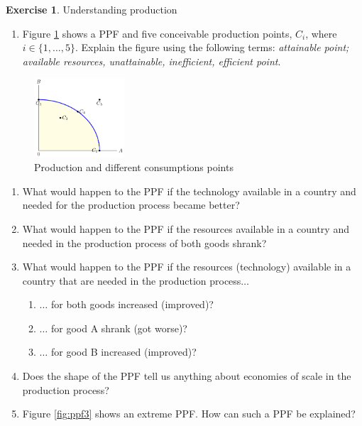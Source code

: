 \documentclass[
  12pt,
  oneside]{book}
\providecommand{\tightlist}{%
  \setlength{\itemsep}{0pt}\setlength{\parskip}{0pt}}
\theoremstyle{definition}
\theoremstyle{definition}
\theoremstyle{definition}
\newtheorem{exercise}{Exercise}[chapter]
\theoremstyle{definition}
\theoremstyle{remark}
\begin{document}
\begin{exercise}
\protect\hypertarget{exr:Uproduction}{}\label{exr:Uproduction}Understanding production

\begin{enumerate}
\def\labelenumi{\alph{enumi})}
\tightlist
\item
  Figure \ref{fig:ppf2} shows a PPF and five conceivable production points, \(C_i\), where \(i\in \{1,\dots,5\}\).
  Explain the figure using the following terms: \emph{attainable point; available resources, unattainable, inefficient, efficient point}.
\end{enumerate}

\begin{figure}
\centering
\includegraphics[width=0.3\textwidth,height=\textheight]{fig/ppf2.png}
\caption{\label{fig:ppf2} Production and different consumptions points}
\end{figure}

\begin{enumerate}
\def\labelenumi{\alph{enumi})}
\setcounter{enumi}{1}
\item
  What would happen to the PPF if the technology available in a country and needed for the production process became better?
\item
  What would happen to the PPF if the resources available in a country and needed in the production process of both goods shrank?
\item
  What would happen to the PPF if the resources (technology) available in a country that are needed in the production process\(\dots\)

  \begin{enumerate}
  \def\labelenumii{\roman{enumii})}
  \tightlist
  \item
    \(\dots\) for both goods increased (improved)?
  \item
    \(\dots\) for good A shrank (got worse)?
  \item
    \(\dots\) for good B increased (improved)?
  \end{enumerate}
\item
  Does the shape of the PPF tell us anything about economies of scale in the production process?
\item
  Figure \ref{fig:ppf3} shows an extreme PPF. How can such a PPF be explained?
\end{enumerate}


\end{exercise}
\end{document}
